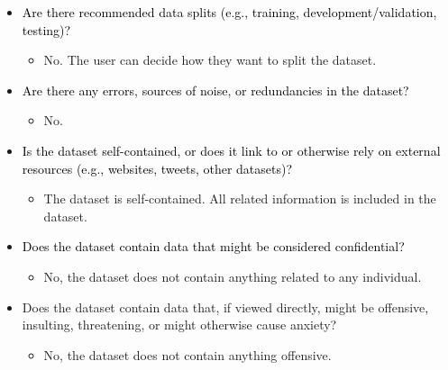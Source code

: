 \documentclass{article}
\newcommand{\ques}[1]{\textcolor{black}{#1}}
\begin{document}
\begin{itemize}
\begin{itemize}
    \end{itemize}
    \item \ques{Are there recommended data splits (e.g., training, development/validation, testing)?}
    \begin{itemize}
        \item No. The user can decide how they want to split the dataset.
    \end{itemize}
    \item \ques{Are there any errors, sources of noise, or redundancies in the
dataset?}
    \begin{itemize}
        \item No.
    \end{itemize}
    \item \ques{Is the dataset self-contained, or does it link to or otherwise rely on external resources (e.g., websites, tweets, other datasets)?}
    \begin{itemize}
        \item The dataset is self-contained. All related information is included in the dataset.
    \end{itemize}
    \item \ques{Does the dataset contain data that might be considered confidential?}
    \begin{itemize}
        \item No, the dataset does not contain anything related to any individual.
    \end{itemize}
    \item Does the dataset contain data that, if viewed directly, might be offensive, insulting, threatening, or might otherwise cause anxiety?
    \begin{itemize}
        \item No, the dataset does not contain anything offensive.
    \end{itemize}
\end{itemize}
\end{document}
